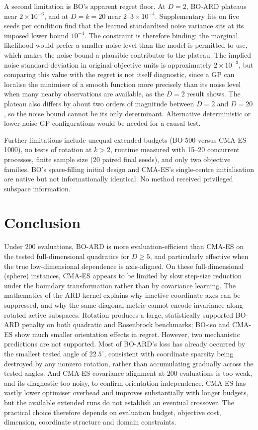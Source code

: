 \documentclass[11pt,a4paper]{article}
\begin{document}
A second limitation is BO's apparent regret floor. At $D=2$, BO-ARD plateaus near $2\times10^{-6}$, and at $D=k=20$ near $2$--$3\times10^{-4}$. Supplementary fits on five seeds per condition find that the learned standardised noise variance sits at its imposed lower bound $10^{-4}$. The constraint is therefore binding: the marginal likelihood would prefer a smaller noise level than the model is permitted to use, which makes the noise bound a plausible contributor to the plateau. The implied noise standard deviation in original objective units is approximately $2\times10^{-3}$, but comparing this value with the regret is not itself diagnostic, since a GP can localise the minimiser of a smooth function more precisely than its noise level when many nearby observations are available, as the $D=2$ result shows. The plateau also differs by about two orders of magnitude between $D=2$ and $D=20$, so the noise bound cannot be its only determinant. Alternative deterministic or lower-noise GP configurations would be needed for a causal test.

Further limitations include unequal extended budgets (BO 500 versus CMA-ES 1000), no tests of rotation at $k>2$, runtime measured with 15--20 concurrent processes, finite sample size (20 paired final seeds), and only two objective families. BO's space-filling initial design and CMA-ES's single-centre initialisation are native but not informationally identical. No method received privileged subspace information.

\section{Conclusion}
Under 200 evaluations, BO-ARD is more evaluation-efficient than CMA-ES on the tested full-dimensional quadratics for $D\ge5$, and particularly effective when the true low-dimensional dependence is axis-aligned. On these full-dimensional (sphere) instances, CMA-ES appears to be limited by slow step-size reduction under the boundary transformation rather than by covariance learning. The mathematics of the ARD kernel explains why inactive coordinate axes can be suppressed, and why the same diagonal metric cannot encode invariance along rotated active subspaces. Rotation produces a large, statistically supported BO-ARD penalty on both quadratic and Rosenbrock benchmarks; BO-iso and CMA-ES show much smaller orientation effects in regret. However, two mechanistic predictions are not supported. Most of BO-ARD's loss has already occurred by the smallest tested angle of $22.5^\circ$, consistent with coordinate sparsity being destroyed by any nonzero rotation, rather than accumulating gradually across the tested angles. And CMA-ES covariance alignment at 200 evaluations is too weak, and its diagnostic too noisy, to confirm orientation independence. CMA-ES has vastly lower optimiser overhead and improves substantially with longer budgets, but the available extended runs do not establish an eventual crossover. The practical choice therefore depends on evaluation budget, objective cost, dimension, coordinate structure and domain constraints.
\end{document}
